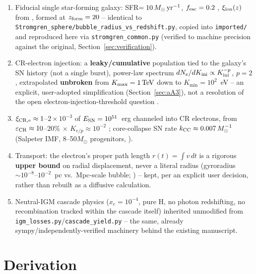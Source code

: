 \documentclass[11pt,a4paper]{article}
\newcommand{\Msun}{\,M_\odot}
\newcommand{\Kini}{K_{\rm ini}}
\begin{document}
\begin{enumerate}
\item Fiducial single star-forming galaxy: SFR$=10\Msun\,{\rm yr}^{-1}$, $f_{\rm esc}=0.2$
      \citep{Robertson2015}, $\xi_{\rm ion}(z)$ from \citet{Llerena2024}, formed at
      $z_{\rm form}=20$ \citep{Kitayama2004} -- identical to
      \texttt{Stromgren\_sphere/bubble\_radius\_vs\_redshift.py}, copied into
      \texttt{imported/} and reproduced here via \texttt{stromgren\_common.py} (verified to
      machine precision against the original, Section~\ref{sec:verification}).
\item CR-electron injection: a \textbf{leaky/cumulative} population tied to the galaxy's SN
      history (not a single burst), power-law spectrum $dN_e/d\Kini\propto \Kini^{-p}$,
      $p=2$ \citep{Park2015}, extrapolated \textbf{unbroken} from $K_{\max}=1\,{\rm TeV}$ down
      to $K_{\min}=10^2$~eV -- an explicit, user-adopted simplification (Section~\ref{sec:aA3}),
      not a resolution of the open electron-injection-threshold question
      \citep{ElectronInjectionThreshold2025}.
\item $\xi_{\rm CR,e}\approx1$--$2\times10^{-3}$ of $E_{\rm SN}=10^{51}$~erg channeled into CR
      electrons, from $\varepsilon_{\rm CR}\approx10$--$20\%$ \citep{Blasi2013} $\times$
      $K_{e/p}\approx10^{-2}$ \citep{Park2015}; core-collapse SN rate
      $k_{\rm CC}\approx0.007\,M_\odot^{-1}$ (Salpeter IMF, 8--50$M_\odot$ progenitors,
      \citealt{SNrateSFR2012}).
\item Transport: the electron's proper path length $r(t)=\int v\,dt$ is a rigorous
      \textbf{upper bound} on radial displacement, never a literal radius (gyroradius
      $\sim10^{-8}$--$10^{-2}$~pc vs.\ Mpc-scale bubble; \citealt{Jana2018}) -- kept, per an
      explicit user decision, rather than rebuilt as a diffusive calculation.
\item Neutral-IGM cascade physics ($x_e=10^{-4}$, pure H, no photon redshifting, no
      recombination tracked within the cascade itself) inherited unmodified from
      \texttt{igm\_losses.py}/\texttt{cascade\_yield.py} -- the same, already
      sympy/independently-verified machinery behind the existing manuscript.
\end{enumerate}

\section{Derivation}
\label{sec:derivation}
\end{document}
